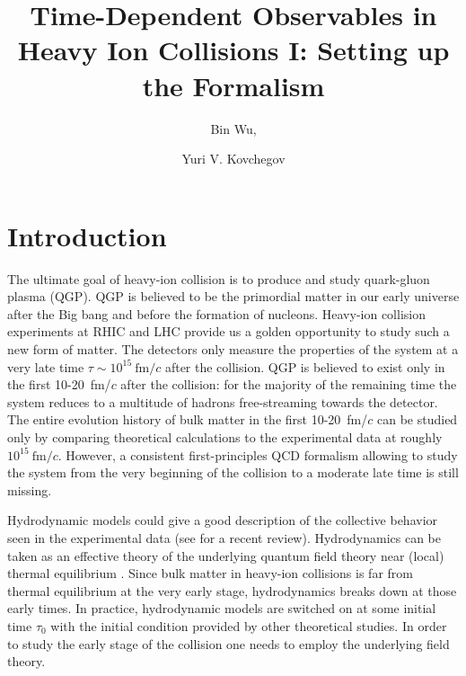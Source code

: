 \documentclass[onecolumn,showpacs,nobibnotes,nofootinbib,12pt,aps,prd,showpacs,notitlepage,nofootinbib,preprintnumbers,amsmath,amssymb]{article}
\title{Time-Dependent Observables in Heavy Ion Collisions I: Setting
  up the Formalism}
\author{Bin Wu,}
\author{Yuri V. Kovchegov}
\affiliation{Department of Physics, The Ohio State University,
  Columbus, OH 43210, USA}
\begin{document}
\maketitle
\flushbottom


\section{Introduction}

The ultimate goal of heavy-ion collision is to produce and study
quark-gluon plasma (QGP). QGP is believed to be the primordial matter
in our early universe after the Big bang and before the formation of
nucleons. Heavy-ion collision experiments at RHIC and LHC provide us a
golden opportunity to study such a new form of matter. The detectors
only measure the properties of the system at a very late time
$\tau\sim 10^{15}~\text{fm}/c$ after the collision. QGP is believed to
exist only in the first 10-20~fm/$c$ after the collision: for the
majority of the remaining time the system reduces to a multitude of
hadrons free-streaming towards the detector. The entire evolution
history of bulk matter in the first 10-20~fm/$c$ can be studied only
by comparing theoretical calculations to the experimental data at
roughly $10^{15}~\text{fm}/c$. However, a consistent first-principles
QCD formalism allowing to study the system from the very beginning of
the collision to a moderate late time is still missing.

Hydrodynamic models could give a good description of the collective
behavior seen in the experimental data (see \cite{Heinz:2013th} for a
recent review). Hydrodynamics can be taken as an effective theory of
the underlying quantum field theory near (local) thermal equilibrium
\cite{Jeon:1995zm}. Since bulk matter in heavy-ion collisions is far
from thermal equilibrium at the very early stage, hydrodynamics breaks
down at those early times. In practice, hydrodynamic models are
switched on at some initial time $\tau_0$ with the initial condition
provided by other theoretical studies. In order to study the early
stage of the collision one needs to employ the underlying field
theory.
\end{document}
